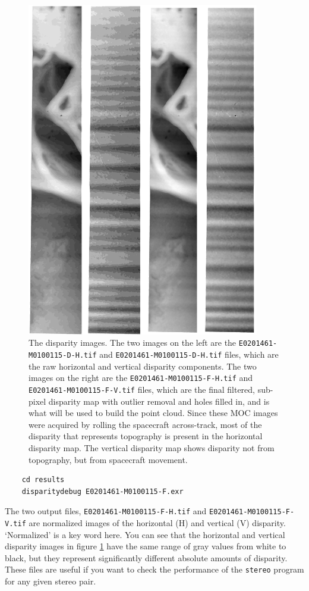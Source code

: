 \begin{figure}[b!]
\begin{minipage}{4in}
\includegraphics[width=4in]{images/p19-disparity.png}
\end{minipage}
\hfill
\begin{minipage}{2.7in}
\caption[P19 disparity images]{
    \label{p19-disparity}
	The disparity images.  The two images on the left are the
	\texttt{E0201461-M0100115-D-H.tif} and 
	\texttt{E0201461-M0100115-D-H.tif} files, which are the raw horizontal and
	vertical disparity components.  The two images on the right are the
	\texttt{E0201461-M0100115-F-H.tif} and
	\texttt{E0201461-M0100115-F-V.tif} files, which are the final
	filtered, sub-pixel disparity map with outlier removal and holes 
	filled in, and is what will be used to build the point cloud.  Since
	these MOC images were acquired by rolling the spacecraft across-track,
	most of the disparity that represents topography is present in the 
	horizontal disparity map.  The vertical disparity map shows disparity
	not from topography, but from spacecraft movement.
    }
\end{minipage}
\end{figure}

\begin{verbatim}
    cd results
    disparitydebug E0201461-M0100115-F.exr
\end{verbatim}
\noindent
The two output files, \texttt{E0201461-M0100115-F-H.tif} and
\texttt{E0201461-M0100115-F-V.tif} are normalized images of the
horizontal (H) and vertical (V) disparity.  `Normalized' is a key
word here.  You can see that the horizontal and vertical disparity
images in figure \ref{p19-disparity} have the same range of gray
values from white to black, but they represent significantly different
absolute amounts of disparity.  These files are useful if you want
to check the performance of the \texttt{stereo} program for any
given stereo pair.

